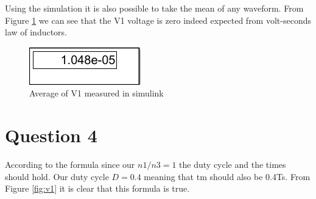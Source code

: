 \documentclass[oneside,12pt]{article}
\begin{document}
 Using the simulation it is also possible to take the mean of any waveform. From Figure \ref{fig:v1avg} we can see that the V1 voltage is zero indeed expected from volt-seconds law of inductors.


\begin{figure}[H]
	\centering
	\includegraphics[scale=1]{../q3/v1_avg}
	\caption{Average of V1 measured in simulink}
	\label{fig:v1avg}
\end{figure}


\section{Question 4}
According to the formula since our $n1/n3=1$ the duty cycle and the times should hold. Our duty cycle $ D=0.4 $ meaning that tm should also be 0.4Ts. From  Figure \ref{fig:v1} it is clear that this formula is true.
\end{document}
